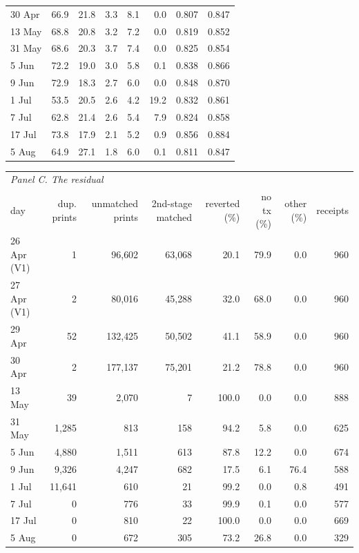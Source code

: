 \begin{table}[htbp]
\begin{tabular}{lrrrrrrr}
30 Apr & 66.9 & 21.8 & 3.3 & 8.1 & 0.0 & 0.807 & 0.847 \\
13 May & 68.8 & 20.8 & 3.2 & 7.2 & 0.0 & 0.819 & 0.852 \\
31 May & 68.6 & 20.3 & 3.7 & 7.4 & 0.0 & 0.825 & 0.854 \\
5 Jun & 72.2 & 19.0 & 3.0 & 5.8 & 0.1 & 0.838 & 0.866 \\
9 Jun & 72.9 & 18.3 & 2.7 & 6.0 & 0.0 & 0.848 & 0.870 \\
1 Jul & 53.5 & 20.5 & 2.6 & 4.2 & 19.2 & 0.832 & 0.861 \\
7 Jul & 62.8 & 21.4 & 2.6 & 5.4 & 7.9 & 0.824 & 0.858 \\
17 Jul & 73.8 & 17.9 & 2.1 & 5.2 & 0.9 & 0.856 & 0.884 \\
5 Aug & 64.9 & 27.1 & 1.8 & 6.0 & 0.1 & 0.811 & 0.847 \\
\bottomrule
\end{tabular}
\par\medskip
\begin{tabular}{lrrrrrrr}
\toprule
\multicolumn{8}{l}{\emph{Panel C. The residual}} \\
day & dup. prints & unmatched prints & 2nd-stage matched & reverted (\%) & no tx (\%) & other (\%) & receipts \\
\midrule
26 Apr (V1) & 1 & 96{,}602 & 63{,}068 & 20.1 & 79.9 & 0.0 & 960 \\
27 Apr (V1) & 2 & 80{,}016 & 45{,}288 & 32.0 & 68.0 & 0.0 & 960 \\
29 Apr & 52 & 132{,}425 & 50{,}502 & 41.1 & 58.9 & 0.0 & 960 \\
30 Apr & 2 & 177{,}137 & 75{,}201 & 21.2 & 78.8 & 0.0 & 960 \\
13 May & 39 & 2{,}070 & 7 & 100.0 & 0.0 & 0.0 & 888 \\
31 May & 1{,}285 & 813 & 158 & 94.2 & 5.8 & 0.0 & 625 \\
5 Jun & 4{,}880 & 1{,}511 & 613 & 87.8 & 12.2 & 0.0 & 674 \\
9 Jun & 9{,}326 & 4{,}247 & 682 & 17.5 & 6.1 & 76.4 & 588 \\
1 Jul & 11{,}641 & 610 & 21 & 99.2 & 0.0 & 0.8 & 491 \\
7 Jul & 0 & 776 & 33 & 99.9 & 0.1 & 0.0 & 577 \\
17 Jul & 0 & 810 & 22 & 100.0 & 0.0 & 0.0 & 669 \\
5 Aug & 0 & 672 & 305 & 73.2 & 26.8 & 0.0 & 329 \\
\bottomrule
\end{tabular}

\end{table}
